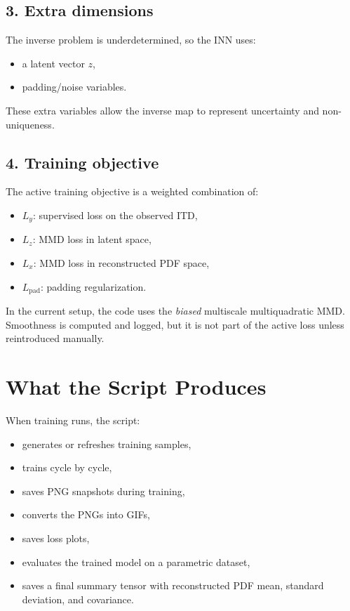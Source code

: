 \documentclass[11pt]{article}
\begin{document}
\subsection*{3. Extra dimensions}
The inverse problem is underdetermined, so the INN uses:
\begin{itemize}[leftmargin=1.5em]
    \item a latent vector $z$,
    \item padding/noise variables.
\end{itemize}
These extra variables allow the inverse map to represent uncertainty and non-uniqueness.

\subsection*{4. Training objective}
The active training objective is a weighted combination of:
\begin{itemize}[leftmargin=1.5em]
    \item $L_y$: supervised loss on the observed ITD,
    \item $L_z$: MMD loss in latent space,
    \item $L_x$: MMD loss in reconstructed PDF space,
    \item $L_{\mathrm{pad}}$: padding regularization.
\end{itemize}
In the current setup, the code uses the \emph{biased} multiscale multiquadratic MMD. Smoothness is computed and logged, but it is not part of the active loss unless reintroduced manually.

\section*{What the Script Produces}
When training runs, the script:
\begin{itemize}[leftmargin=1.5em]
    \item generates or refreshes training samples,
    \item trains cycle by cycle,
    \item saves PNG snapshots during training,
    \item converts the PNGs into GIFs,
    \item saves loss plots,
    \item evaluates the trained model on a parametric dataset,
    \item saves a final summary tensor with reconstructed PDF mean, standard deviation, and covariance.
\end{itemize}
\end{document}

